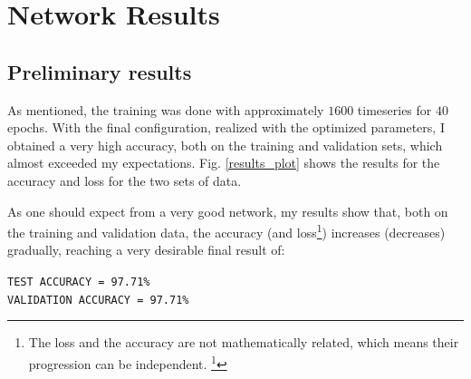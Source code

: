 \documentclass[12pt,a4paper,final]{book}			%
\begin{document}
		\section{Network Results}\label{network_results}
		\subsection{Preliminary results}\label{preliminary_results}
			As mentioned, the training was done with approximately $1600$ timeseries for $40$ epochs. With the final configuration, realized with the optimized parameters, I obtained a very high accuracy, both on the training and validation sets, which almost exceeded my expectations. Fig. \ref{results_plot} shows the results for the accuracy and loss for the two sets of data. 
			
			As one should expect from a very good network, my results show that, both on the training and validation data, the accuracy (and loss\footnote{The loss and the accuracy are not mathematically related, which means their progression can be independent. \footnote{From Harshit Kumar's online blog. url: \texttt{https://kharshit.github.io/blog/2018/12/07/ loss-vs-accuracy}.}}) increases (decreases) gradually, reaching a very desirable final result of:
			\begin{center}
				\texttt{TEST ACCURACY = 97.71\%}\\
				\texttt{VALIDATION ACCURACY = 97.71\%}
			\end{center}
\end{document}
